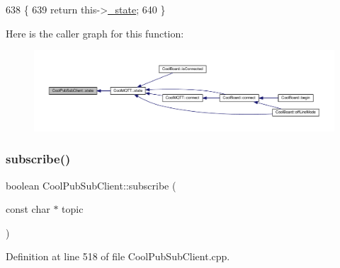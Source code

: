 \begin{DoxyCode}
638                             \{
639     \textcolor{keywordflow}{return} this->\hyperlink{class_cool_pub_sub_client_aa1953b601206252a30efa5b114eb3e1a}{\_state};
640 \}
\end{DoxyCode}
Here is the caller graph for this function\+:\nopagebreak
\begin{figure}[H]
\begin{center}
\leavevmode
\includegraphics[width=350pt]{d8/d4b/class_cool_pub_sub_client_a3245a5afc6d22e61270dcfe392ccb866_icgraph}
\end{center}
\end{figure}
\mbox{\label{class_cool_pub_sub_client_ac1ebc9ad874128aefa985d78496d2e8f}} 
\subsubsection{\texorpdfstring{subscribe()}{subscribe()}\hspace{0.1cm}{\footnotesize\ttfamily [1/2]}}
{\footnotesize\ttfamily boolean Cool\+Pub\+Sub\+Client\+::subscribe (\begin{DoxyParamCaption}\item[{const char $\ast$}]{topic }\end{DoxyParamCaption})}



Definition at line 518 of file Cool\+Pub\+Sub\+Client.\+cpp.


